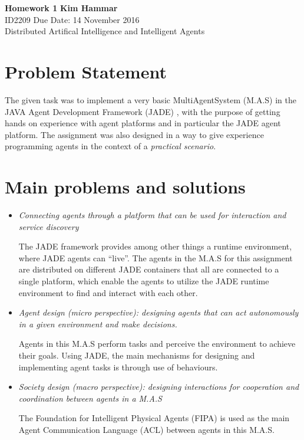 \documentclass[a4paper, 11pt]{article}
\begin{document}
\noindent
\large\textbf{Homework 1} \hfill \textbf{Kim Hammar} \\
\normalsize ID2209 \hfill Due Date: 14 November 2016 \\
Distributed Artifical Intelligence and Intelligent Agents \hfill \\

\section*{Problem Statement}
The given task was to implement a very basic MultiAgentSystem (M.A.S) in the JAVA Agent Development Framework (JADE) \citep{jade}, with the purpose of getting hands on experience with agent platforms and in particular the JADE agent platform. The assignment was also designed in a way to give experience programming agents in the context of a \textit{practical scenario}.

\section*{Main problems and solutions}
\begin{itemize}
\item \textit{Connecting agents through a platform that can be used for interaction and service discovery}

The JADE framework provides among other things a runtime environment, where JADE agents can ``live''. The agents in the M.A.S for this assignment are distributed on different JADE containers that all are connected to a single platform, which enable the agents to utilize the JADE runtime environment to find and interact with each other.

\item \textit{Agent design (micro perspective): designing agents that can act autonomously in a given environment and make decisions.}

Agents in this M.A.S perform tasks and perceive the environment to achieve their goals. Using JADE, the main mechanisms for designing and implementing agent tasks is through use of behaviours.
\item \textit{Society design (macro perspective): designing interactions for cooperation and coordination between agents in a M.A.S}

The Foundation for Intelligent Physical Agents (FIPA) is used as the main Agent Communication Language (ACL) between agents in this M.A.S.
\end{itemize}
\end{document}
